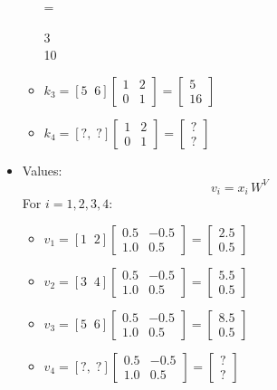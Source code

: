 \begin{itemize}
\begin{itemize}
			 = \begin{bmatrix}3 \\ 10\end{bmatrix}\)
		   \item \(k_3 = [5\;\;6] \begin{bmatrix}1 & 2 \\ 0 & 1\end{bmatrix} 
			 = \begin{bmatrix}5 \\ 16\end{bmatrix}\)
		   \item \(k_4 = [?,\; ?] \begin{bmatrix}1 & 2 \\ 0 & 1\end{bmatrix} 
			 = \begin{bmatrix}? \\ ?\end{bmatrix}\)
	   \end{itemize}
	\item Values:
	   \[
		 v_i = x_i \, W^V
	   \]
	   For \(i=1,2,3,4\):
	   \begin{itemize}
		   \item \(v_1 = [1\;\;2] \begin{bmatrix}0.5 & -0.5 \\ 1.0 & 0.5\end{bmatrix} 
			 = \begin{bmatrix}2.5 \\ 0.5\end{bmatrix}\)
		   \item \(v_2 = [3\;\;4] \begin{bmatrix}0.5 & -0.5 \\ 1.0 & 0.5\end{bmatrix} 
			 = \begin{bmatrix}5.5 \\ 0.5\end{bmatrix}\)
		   \item \(v_3 = [5\;\;6] \begin{bmatrix}0.5 & -0.5 \\ 1.0 & 0.5\end{bmatrix} 
			 = \begin{bmatrix}8.5 \\ 0.5\end{bmatrix}\)
		   \item \(v_4 = [?,\; ?] \begin{bmatrix}0.5 & -0.5 \\ 1.0 & 0.5\end{bmatrix} 
			 = \begin{bmatrix}? \\ ?\end{bmatrix}\)
	   \end{itemize}
\end{itemize}

